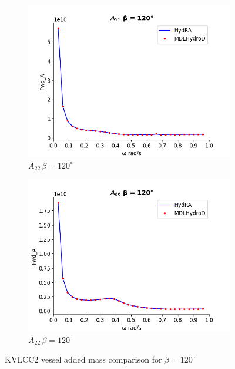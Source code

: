 \begin{figure}[H]
\begin{subfigure}[b]{0.49\textwidth}
        \includegraphics[width=\textwidth]{plots/kvlcc/added_mass/a55.png}
        \caption{$A_{22} \, \beta = 120^{\circ}$}
    \end{subfigure}
    \begin{subfigure}[b]{0.49\textwidth}
        \includegraphics[width=\textwidth]{plots/kvlcc/added_mass/a66.png}
        \caption{$A_{22} \, \beta = 120^{\circ}$}
    \end{subfigure}
    \caption{KVLCC2 vessel added mass comparison for $\beta=120^{\circ}$}
    \label{fig:kvlcc_addedmass}
\end{figure}

